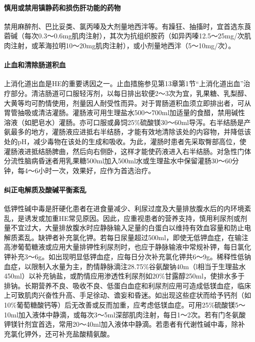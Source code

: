 \paragraph{慎用或禁用镇静药和损伤肝功能的药物}

禁用麻醉剂、巴比妥类、氯丙嗪及大剂量地西泮等。有躁狂、抽搐时，宜首选东莨菪碱（每次0.3～0.6mg肌肉注射），其次为抗组织胺药（如异丙嗪12.5～25mg/次肌肉注射，或苯海拉明10～20mg肌肉注射），或小剂量地西泮（5～10mg/次）。

\paragraph{止血和清除肠道积血}

上消化道出血是HE的重要诱因之一。止血措施参见第13章第1节“上消化道出血”治疗部分。清洁肠道可口服轻泻剂，以每日排出软便2～3次为宜，乳果糖、乳梨醇、大黄等均可酌情使用，剂量因人耐受性而异。对于胃肠道积血须立即排出者，可从胃管抽吸或清洁灌肠。灌肠液可用生理盐水500～700ml加适量的食醋，禁用碱性溶液（如肥皂水）灌肠。亦可口服或鼻饲25\%硫酸镁30～60ml导泻。右半结肠是产氨最多的地方，灌肠液应进抵右半结肠，才能有效地清除该处的内容物，并降低该处的pH，减少毒物在该处的生成和吸收。为此，灌肠时患者先采取臀部高位，使灌肠液进抵结肠脾曲，然后向右侧卧，这样才能使药液进入右半结肠。对急性门体分流性脑病昏迷者用乳果糖500ml加入500ml水或生理盐水中保留灌肠30～60分钟，每4～6小时一次，效果好，应作为首选治疗。

\paragraph{纠正电解质及酸碱平衡紊乱}

低钾性碱中毒是肝硬化患者在进食量减少、利尿过度及大量排放腹水后的内环境紊乱，是诱发或加重HE常见原因。因此，应重视患者的营养支持，慎用利尿剂或剂量不宜过大，大量排放腹水时应静脉输入足量的白蛋白以维持有效血容量和防止电解质紊乱。缺钾者补充氯化钾。若每日尿量超过500ml，即使无低钾血症，在输注高渗葡萄糖液或应用大量排钾性利尿剂时，也应于静脉输液中常规补钾，每日氯化钾补充3～6g。如出现明显低钾血症，应每日分次补充氯化钾共6～9g。稀释性低钠血症，以限制入水量为主，酌情静脉滴注28.75\%谷氨酸钠40m（l相当于生理盐水450ml）以补充钠盐，或酌情应用渗透性利尿剂如20\%甘露醇250ml，使排水多于排钠。长期营养不良、吸收不良、低蛋白血症和利尿剂应用可造成低镁血症，临床上可致肌肉兴奋性升高、手足徐动、谵妄和昏迷。如出现这些症状而给予钙剂（如10\%葡萄糖酸钙等）后无改善或反而加重，应考虑低镁血症。可用25\%硫酸镁5～10ml加入液体中静滴，或每次3～5ml深部肌肉注射，每日1～2次。若有门冬氨酸钾镁针剂宜首选，常用20～40ml加入液体中静滴。若患者有代谢性碱中毒，除补充氯化钾外，还可补充盐酸精氨酸。


